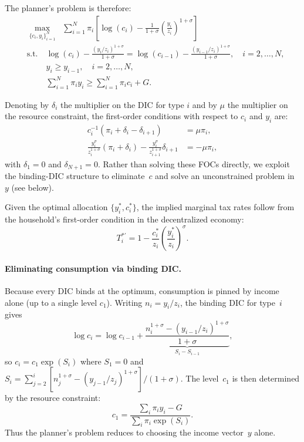 \documentclass[12pt,a4paper]{article}
\theoremstyle{definition}
\theoremstyle{plain}
\theoremstyle{remark}
\begin{document}
\medskip

The planner's problem is therefore:
\begin{align}
  &\max_{\{c_i, y_i\}_{i=1}^{N}} \;\; \sum_{i=1}^{N} \pi_i \left[\log(c_i) - \frac{1}{1+\sigma}\left(\frac{y_i}{z_i}\right)^{1+\sigma}\right] \label{eq:mirrlees_obj} \\
  &\text{s.t.} \quad \log(c_i) - \frac{(y_i/z_i)^{1+\sigma}}{1+\sigma} = \log(c_{i-1}) - \frac{(y_{i-1}/z_i)^{1+\sigma}}{1+\sigma}, \quad i = 2, \ldots, N, \label{eq:DIC_explicit} \\
  &\phantom{\text{s.t.}} \quad y_i \geq y_{i-1}, \quad i = 2, \ldots, N, \label{eq:monotone} \\
  &\phantom{\text{s.t.}} \quad \sum_{i=1}^{N} \pi_i y_i \geq \sum_{i=1}^{N} \pi_i c_i + G. \label{eq:RC_discrete}
\end{align}

Denoting by $\delta_i$ the multiplier on the DIC for type $i$ and by $\mu$ the multiplier on the resource constraint, the first-order conditions with respect to $c_i$ and $y_i$ are:
\begin{align}
  c_i^{-1}(\pi_i + \delta_i - \delta_{i+1}) &= \mu \pi_i, \label{eq:FOC_c} \\
  \frac{y_i^{\sigma}}{z_i^{1+\sigma}}(\pi_i + \delta_i) - \frac{y_i^{\sigma}}{z_{i+1}^{1+\sigma}}\delta_{i+1} &= -\mu\pi_i, \label{eq:FOC_y}
\end{align}
with $\delta_1 = 0$ and $\delta_{N+1} = 0$.  Rather than solving these FOCs directly, we exploit the binding-DIC structure to eliminate~$c$ and solve an unconstrained problem in~$y$ (see below).

Given the optimal allocation $\{y_i^*, c_i^*\}$, the implied marginal tax rates follow from the household's first-order condition in the decentralized economy:
\begin{equation}
  T_i^{*\prime} = 1 - \frac{c_i^*}{z_i}\left(\frac{y_i^*}{z_i}\right)^{\sigma}.
  \label{eq:mirrlees_mtr}
\end{equation}

\paragraph{Eliminating consumption via binding DIC.}
Because every DIC binds at the optimum, consumption is pinned by income alone (up to a single level $c_1$).  Writing $n_i = y_i/z_i$, the binding DIC for type~$i$ gives
\begin{equation}
  \log c_i = \log c_{i-1} + \underbrace{\frac{n_i^{1+\sigma} - (y_{i-1}/z_i)^{1+\sigma}}{1+\sigma}}_{S_i - S_{i-1}},
  \label{eq:DIC_chain}
\end{equation}
so $c_i = c_1 \exp(S_i)$ where $S_1 = 0$ and $S_i = \sum_{j=2}^{i}[n_j^{1+\sigma} - (y_{j-1}/z_j)^{1+\sigma}]/(1+\sigma)$.  The level~$c_1$ is then determined by the resource constraint:
\begin{equation}
  c_1 = \frac{\sum_{i}\pi_i y_i - G}{\sum_{i}\pi_i \exp(S_i)}.
  \label{eq:c1_from_RC}
\end{equation}
Thus the planner's problem reduces to choosing the income vector~$y$ alone.
\end{document}
